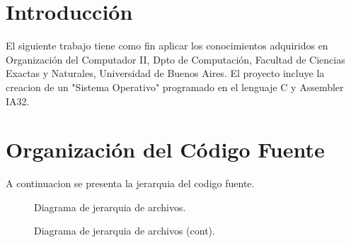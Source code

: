 \documentclass[a4paper,10pt]{article}
\begin{document}
\newpage
\tableofcontents
\newpage



\section*{Introducci\'on}
El siguiente trabajo tiene como fin aplicar los conocimientos adquiridos en Organización del Computador II, Dpto de Computación, Facultad de Ciencias Exactas y Naturales, Universidad de Buenos Aires.	El proyecto incluye la creacion de un "Sistema Operativo" programado en el lenguaje C y Assembler IA32.



\section*{Organizaci\'on del C\'odigo Fuente}
A continuacion se presenta la jerarquia del codigo fuente.

\begin{figure}[H]
\centering
{}
\caption{Diagrama de jerarquia de archivos.}
\end{figure}

\begin{figure}[H]
\centering
{}
\caption{Diagrama de jerarquia de archivos (cont).}
\end{figure}
\end{document}

